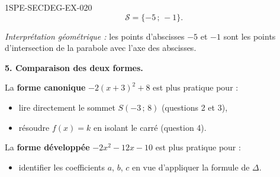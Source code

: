 \begin{corrige}{1SPE-SECDEG-EX-020}
\[\boxed{\mathcal{S} = \{-5\,;\,-1\}.}\]

\textit{Interprétation géométrique :} les points d'abscisses $-5$ et $-1$ sont les points d'intersection de la parabole avec l'axe des abscisses.

\medskip
\textbf{5. Comparaison des deux formes.}

La \textbf{forme canonique} $-2(x+3)^2 + 8$ est plus pratique pour :
\begin{itemize}
  \item lire directement le sommet $S(-3\,;\,8)$ (questions 2 et 3),
  \item résoudre $f(x) = k$ en isolant le carré (question 4).
\end{itemize}

La \textbf{forme développée} $-2x^2 - 12x - 10$ est plus pratique pour :
\begin{itemize}
  \item identifier les coefficients $a$, $b$, $c$ en vue d'appliquer la formule de $\Delta$.
\end{itemize}

\end{corrige}
